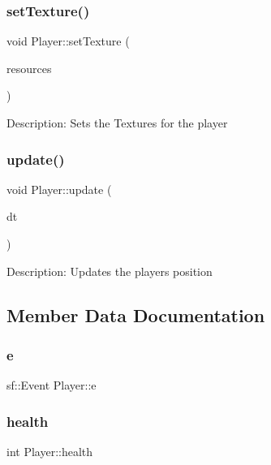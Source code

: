 \subsubsection{\texorpdfstring{setTexture()}{setTexture()}}
{\footnotesize\ttfamily void Player\+::set\+Texture (\begin{DoxyParamCaption}\item[{\mbox{\hyperlink{class_resource_manager}{Resource\+Manager}} \&}]{resources }\end{DoxyParamCaption})}

Description\+: Sets the Textures for the player \mbox{\label{class_player_a9117f98ab1e6f0d58c099f3c721f4906}} 
\subsubsection{\texorpdfstring{update()}{update()}}
{\footnotesize\ttfamily void Player\+::update (\begin{DoxyParamCaption}\item[{double}]{dt }\end{DoxyParamCaption})}

Description\+: Updates the players position 

\subsection{Member Data Documentation}
\mbox{\label{class_player_ae78c3b0c8074de09d30bbafa899c6c47}} 
\subsubsection{\texorpdfstring{e}{e}}
{\footnotesize\ttfamily sf\+::\+Event Player\+::e}

\mbox{\label{class_player_aad33b52bfe73c4c978a3135172f286a0}} 
\subsubsection{\texorpdfstring{health}{health}}
{\footnotesize\ttfamily int Player\+::health}

\mbox{\label{class_player_a5f3088b84a4ba515a053122b9539ab24}} 
